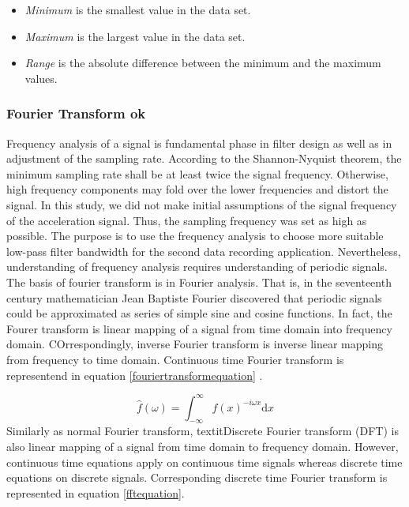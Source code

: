 \documentclass[english,12pt,a4paper,pdftex,elec,utf8]{aaltothesis}
\begin{document}
\begin{itemize}
\item \textit{Minimum} is the smallest value in the data set.

\item \textit{Maximum} is the largest value in the data set.

\item \textit{Range} is the absolute difference between the minimum and the maximum values.
\end{itemize}




\subsubsection{Fourier Transform ok} \label{fouriertransformsection}

Frequency analysis of a signal is fundamental phase in filter design as well as in adjustment of the sampling rate. According to the Shannon-Nyquist theorem, the minimum sampling rate shall be at least twice the signal frequency. Otherwise, high frequency components may fold over the lower frequencies and distort the signal. In this study, we did not make initial assumptions of the signal frequency of the acceleration signal. Thus, the sampling frequency was set as high as possible. The purpose is to use the frequency analysis to choose more suitable low-pass filter bandwidth for the second data recording application. Nevertheless, understanding of frequency analysis requires understanding of periodic signals. The basis of fourier transform is in Fourier analysis. That is, in the seventeenth century mathematician Jean Baptiste Fourier discovered that periodic signals could be approximated as series of simple sine and cosine functions. In fact, the Fourer transform is linear mapping of a signal from time domain into frequency domain. COrrespondingly, inverse Fourier transform is inverse linear mapping from frequency to time domain. Continuous time Fourier transform is representend in equation \ref{fouriertransformequation} \cite{khan2005digital}. 


\begin{equation} \label{fouriertransformequation}
\hat{f}(\omega) =  \int_{- \infty} ^{\infty} f(x) ^{-i\omega x} \mathrm{d}x
\end{equation}  
Similarly as normal Fourier transform, textit{Discrete Fourier transform (DFT)} is also linear mapping of a signal from time domain to frequency domain. However, continuous time equations apply on continuous time signals whereas discrete time equations on discrete signals. Corresponding discrete time Fourier transform is represented in equation \ref{fftequation}.
\end{document}
